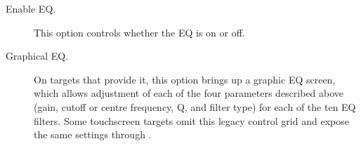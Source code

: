 
\begin {description}
  \item[Enable EQ.]
  This option controls whether the EQ is on or off.

  \item[Graphical EQ.]
  On targets that provide it, this option brings up a graphic EQ screen, which
  allows adjustment of each of the four parameters described above (gain,
  cutoff or centre frequency, Q, and filter type) for each of the ten EQ
  filters. Some touchscreen targets omit this legacy control grid and expose
  the same settings through .


\end{description}
